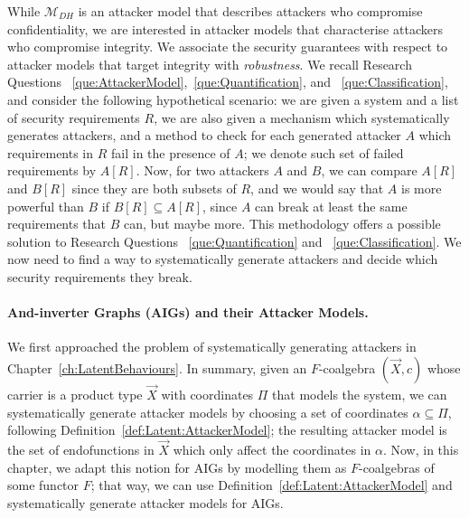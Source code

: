 While $\mathcal{M}_{DH}$ is an attacker model that describes attackers who compromise confidentiality, we are interested in attacker models that characterise attackers who compromise integrity. We associate the security guarantees with respect to attacker models that target integrity with \emph{robustness}. We recall Research Questions ~\ref{que:AttackerModel},~\ref{que:Quantification}, and ~\ref{que:Classification}, and consider the following hypothetical scenario: we are given a system and a list of security requirements ${R}$, we are also given a mechanism which systematically generates attackers, and a method to check for each generated attacker $A$ which requirements in ${R}$ fail in the presence of $A$; we denote such set of failed requirements by $A[{R}]$. Now, for two attackers $A$ and $B$, we can compare $A[{R}]$ and $B[{R}]$ since they are both subsets of $R$, and we would say that $A$ is more powerful than $B$ if $B[{R}]\subseteq A[{R}]$, since $A$ can break at least the same requirements that $B$ can, but maybe more. This methodology offers a possible solution to Research Questions ~\ref{que:Quantification} and ~\ref{que:Classification}. We now need to find a way to systematically generate attackers and decide which security requirements they break. 

\paragraph{And-inverter Graphs (AIGs) and their Attacker Models.} We first approached the problem of systematically generating attackers in Chapter~\ref{ch:LatentBehaviours}. In summary, given an $F$-coalgebra $(\vec{X},c)$ whose carrier is a product type $\vec{X}$ with coordinates $\Pi$ that models the system, we can systematically generate attacker models by choosing a set of coordinates $\alpha\subseteq \Pi$, following Definition~\ref{def:Latent:AttackerModel}; the resulting attacker model is the set of endofunctions in $\vec{X}$ which only affect the coordinates in $\alpha$. Now, in this chapter, we adapt this notion for AIGs by modelling them as $F$-coalgebras of some functor $F$; that way, we can use Definition~\ref{def:Latent:AttackerModel} and systematically generate attacker models for AIGs. 

